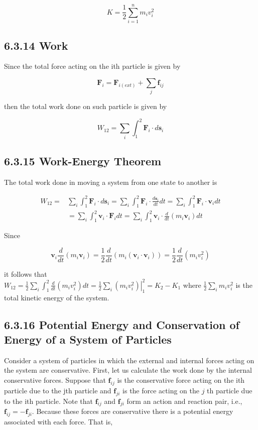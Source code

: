 \documentclass[10pt]{article}
\begin{document}
$$
K=\frac{1}{2} \sum_{i=1}^{n} m_{i} v_{i}^{2}
$$

\subsection*{6.3.14 Work}
Since the total force acting on the ith particle is given by

$$
\mathbf{F}_{i}=\mathbf{F}_{i(e x t)}+\sum_{j} \mathbf{f}_{i j}
$$

then the total work done on such particle is given by

$$
W_{12}=\sum_{i} \int_{1}^{2} \mathbf{F}_{i} \cdot d \mathbf{s}_{i}
$$

\subsection*{6.3.15 Work-Energy Theorem}
The total work done in moving a system from one state to another is

$$
\begin{aligned}
W_{12}= & \sum_{i} \int_{1}^{2} \mathbf{F}_{i} \cdot d \mathbf{s}_{i}=\sum_{i} \int_{1}^{2} \mathbf{F}_{i} \cdot \frac{d \mathbf{s}_{i}}{d t} d t=\sum_{i} \int_{1}^{2} \mathbf{F}_{i} \cdot \mathbf{v}_{i} d t \\
& =\sum_{i} \int_{1}^{2} \mathbf{v}_{i} \cdot \mathbf{F}_{i} d t=\sum_{i} \int_{1}^{2} \mathbf{v}_{i} \cdot \frac{d}{d t}\left(m_{i} \mathbf{v}_{i}\right) d t
\end{aligned}
$$

Since

$$
\mathbf{v}_{i} \frac{d}{d t}\left(m_{i} \mathbf{v}_{i}\right)=\frac{1}{2} \frac{d}{d t}\left(m_{i}\left(\mathbf{v}_{i} \cdot \mathbf{v}_{i}\right)\right)=\frac{1}{2} \frac{d}{d t}\left(m_{i} v_{i}^{2}\right)
$$

it follows that\\
$W_{12}=\frac{1}{2} \sum_{i} \int_{1}^{2} \frac{d}{d t}\left(m_{i} v_{i}^{2}\right) d t=\left.\frac{1}{2} \sum_{i}\left(m_{i} v_{i}^{2}\right)\right|_{1} ^{2}=K_{2}-K_{1}$ where $\frac{1}{2} \sum_{i} m_{i} v_{i}^{2}$ is the total kinetic energy of the system.

\subsection*{6.3.16 Potential Energy and Conservation of Energy of a System of Particles}
Consider a system of particles in which the external and internal forces acting on the system are conservative. First, let us calculate the work done by the internal conservative forces. Suppose that $\mathbf{f}_{i j}$ is the conservative force acting on the ith particle due to the jth particle and $\mathbf{f}_{j i}$ is the force acting on the $j$ th particle due to the ith particle. Note that $\mathbf{f}_{i j}$ and $\mathbf{f}_{j i}$ form an action and reaction pair, i.e., $\mathbf{f}_{i j}=-\mathbf{f}_{j i}$. Because these forces are conservative there is a potential energy associated with each force. That is,
\end{document}
